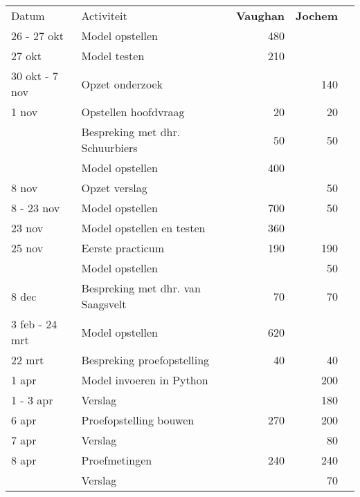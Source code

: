 \documentclass[a4paper]{article}
\begin{document}
	\begin{table}[h]
		\centering

		\begin{tabular}{|l|l|r|r|l} \cline{1-4}
			Datum   & Activiteit				  & \textbf{Vaughan} & \textbf{Jochem} & \\ \cline{1-4}
			26 - 27 okt & Model opstellen      & 480       &           & \\ \cline{1-4}
			27 okt  & Model testen       	   & 210       &           & \\ \cline{1-4}
			30 okt - 7 nov & Opzet onderzoek   &           & 140       & \\ \cline{1-4}
			1 nov   & Opstellen hoofdvraag     & 20        & 20        & \\ \cline{1-4}
			        & Bespreking met dhr. Schuurbiers & 50 & 50        & \\ \cline{1-4}
			        & Model opstellen          & 400       &           & \\ \cline{1-4}
			8 nov   & Opzet verslag            &           & 50        & \\ \cline{1-4}
			8 - 23 nov & Model opstellen       & 700       & 50        & \\ \cline{1-4}
			23 nov	& Model opstellen en testen & 360      &           & \\ \cline{1-4}
			25 nov  & Eerste practicum         & 190       & 190       & \\ \cline{1-4}
			        & Model opstellen          &           & 50        & \\ \cline{1-4}
			8 dec   & Bespreking met dhr. van Saagsvelt & 70 & 70      & \\ \cline{1-4}
			3 feb - 24 mrt & Model opstellen    & 620      &           & \\ \cline{1-4}
			22 mrt  & Bespreking proefopstelling & 40      & 40        & \\ \cline{1-4}
			1 apr   & Model invoeren in Python &           & 200       & \\ \cline{1-4}
			1 - 3 apr & Verslag                &           & 180       & \\ \cline{1-4}
			6 apr   & Proefopstelling bouwen   & 270       & 200       & \\ \cline{1-4}
			7 apr   & Verslag                  &           & 80        & \\ \cline{1-4}
			8 apr   & Proefmetingen            & 240       & 240       & \\ \cline{1-4}
			        & Verslag                  &           & 70        & \\ \cline{1-4}

\end{tabular}
\end{table}
\end{document}
